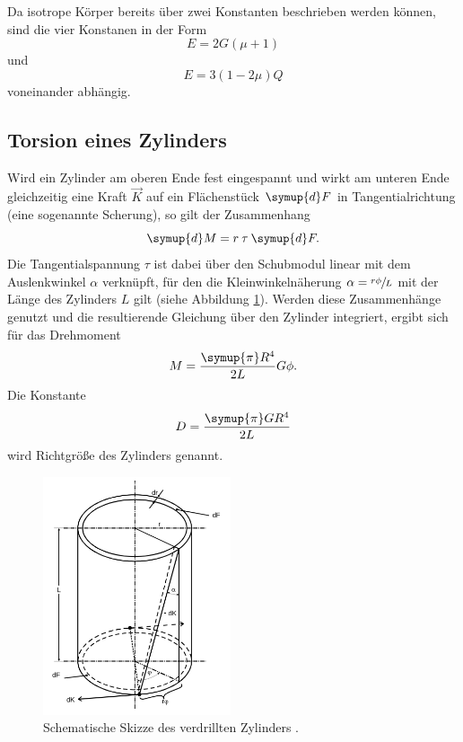 Da isotrope Körper bereits über zwei Konstanten beschrieben werden können, sind
die vier Konstanen in der Form
\begin{equation}
    E = 2 G \left(\mu + 1\right)
    \label{eqn:Querkonstante}
\end{equation}
und
\begin{equation}
  E = 3 \left(1 - 2\mu\right) Q
  \label{eqn:Kompressionsmodul}
\end{equation}
voneinander abhängig.

\subsection{Torsion eines Zylinders}
\label{sec:TorsionZylinder}

Wird ein Zylinder am oberen Ende fest eingespannt und wirkt am unteren Ende
gleichzeitig eine Kraft $\vec{K}$ auf ein Flächenstück $\symup{d}F$ in
Tangentialrichtung (eine sogenannte Scherung), so gilt der Zusammenhang
\begin{equation*}
  \symup{d}M = r\:\tau\:\symup{d}F.
\end{equation*}
Die Tangentialspannung $\tau$ ist dabei über den Schubmodul linear mit dem
Auslenkwinkel $\alpha$ verknüpft, für den die Kleinwinkelnäherung
$\alpha = \sfrac{r\phi}{L}$
mit der Länge des Zylinders $L$ gilt
(siehe Abbildung \ref{fig:ZylinderSchema}). Werden diese Zusammenhänge genutzt und
die resultierende Gleichung über den Zylinder integriert, ergibt sich für
das Drehmoment
\begin{equation*}
  M = \frac{\symup{\pi} R^4}{2 L} G \phi.
\end{equation*}
Die Konstante
\begin{equation}
  D = \frac{\symup{\pi} G R^4}{2 L}
  \label{eqn:Richtgröße}
\end{equation}
wird Richtgröße des Zylinders genannt.

\begin{figure}
  \centering
  \includegraphics[height=7cm]{content/Zylinder.jpg}
  \caption{Schematische Skizze des verdrillten Zylinders \cite{anleitung}.}
  \label{fig:ZylinderSchema}
\end{figure}

